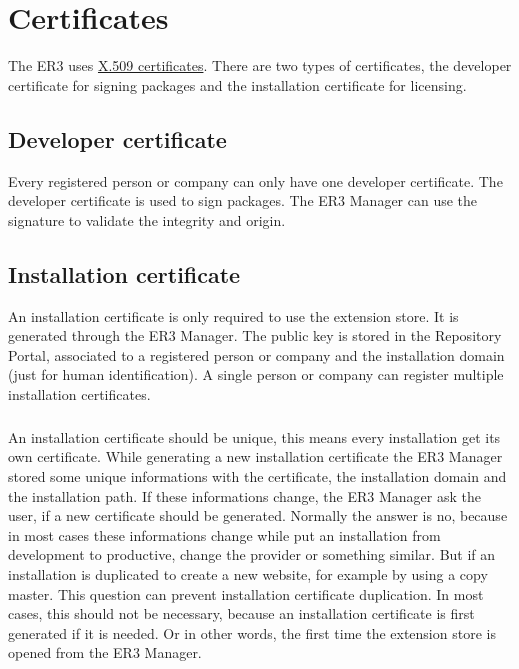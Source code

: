 \label{sec:certificates} 
\chapter{Certificates}

The ER3 uses \href{http://en.wikipedia.org/wiki/X.509}{X.509 certificates}.
There are two types of certificates, the developer certificate for signing packages and the installation certificate for licensing.

\section[sec:developer certificate]{Developer certificate}

Every registered person or company can only have one developer certificate.
The developer certificate is used to sign packages.
The ER3 Manager can use the signature to validate the integrity and origin.

\section[sec:installation certificate]{Installation certificate}

An installation certificate is only required to use the extension store.
It is generated through the ER3 Manager.
The public key is stored in the Repository Portal, associated to a registered person or company and the installation domain (just for human identification).
A single person or company can register multiple installation certificates.

\paragraph{}
An installation certificate should be unique, this means every installation get its own certificate.
While generating a new installation certificate the ER3 Manager stored some unique informations with the certificate, the installation domain and the installation path.
If these informations change, the ER3 Manager ask the user, if a new certificate should be generated.
Normally the answer is no, because in most cases these informations change while put an installation from development to productive, change the provider or something similar.
But if an installation is duplicated to create a new website, for example by using a copy master. This question can prevent installation certificate duplication.
In most cases, this should not be necessary, because an installation certificate is first generated if it is needed. Or in other words, the first time the extension store is opened from the ER3 Manager.

